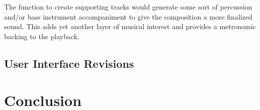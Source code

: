 The function to create supporting tracks would generate some sort of percussion and/or bass instrument accompaniment to give the composition a more finalized sound.  This adds yet another layer of musical interest and provides a metronomic backing to the playback.

\subsection{User Interface Revisions}
\label{subsec:userinterfacerevisions}



\section{Conclusion}
\label{conclusion}

